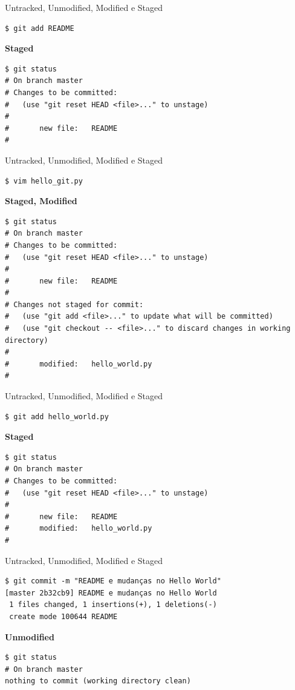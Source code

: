 \documentclass[portuguese,brazil]{beamer}
\begin{document}
\begin{frame}[fragile]{Untracked, Unmodified, Modified e Staged}
\begin{verbatim}
$ git add README
\end{verbatim}
\pause
\textbf{Staged}
\begin{verbatim}
$ git status
# On branch master
# Changes to be committed:
#   (use "git reset HEAD <file>..." to unstage)
#
#       new file:   README
#
\end{verbatim}
\end{frame}

\begin{frame}[fragile]{Untracked, Unmodified, Modified e Staged}
\begin{verbatim}
$ vim hello_git.py
\end{verbatim}
\pause
\textbf{Staged, Modified}
\tiny{
\begin{verbatim}
$ git status
# On branch master
# Changes to be committed:
#   (use "git reset HEAD <file>..." to unstage)
#
#       new file:   README
#
# Changes not staged for commit:
#   (use "git add <file>..." to update what will be committed)
#   (use "git checkout -- <file>..." to discard changes in working directory)
#
#       modified:   hello_world.py
#
\end{verbatim}
}
\end{frame}

\begin{frame}[fragile]{Untracked, Unmodified, Modified e Staged}
\begin{verbatim}
$ git add hello_world.py
\end{verbatim}
\pause
\textbf{Staged}
\begin{verbatim}
$ git status
# On branch master
# Changes to be committed:
#   (use "git reset HEAD <file>..." to unstage)
#
#       new file:   README
#       modified:   hello_world.py
#
\end{verbatim}
\end{frame}

\begin{frame}[fragile]{Untracked, Unmodified, Modified e Staged}
\begin{verbatim}
$ git commit -m "README e mudanças no Hello World"
[master 2b32cb9] README e mudanças no Hello World
 1 files changed, 1 insertions(+), 1 deletions(-)
 create mode 100644 README
\end{verbatim}
\pause
\textbf{Unmodified}
\begin{verbatim}
$ git status
# On branch master
nothing to commit (working directory clean)
\end{verbatim}
\end{frame}
\end{document}
